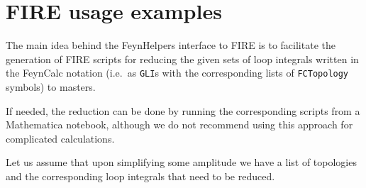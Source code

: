 \documentclass[../FeynHelpersManual.tex]{subfiles}
\begin{document}
\hypertarget{fire usage examples}{
\section{FIRE usage examples}\label{fire usage examples}}

The main idea behind the FeynHelpers interface to FIRE is to facilitate
the generation of FIRE scripts for reducing the given sets of loop
integrals written in the FeynCalc notation (i.e.~as \texttt{GLI}s with
the corresponding lists of \texttt{FCTopology} symbols) to masters.

If needed, the reduction can be done by running the corresponding
scripts from a Mathematica notebook, although we do not recommend using
this approach for complicated calculations.

Let us assume that upon simplifying some amplitude we have a list of
topologies and the corresponding loop integrals that need to be reduced.

\begin{Shaded}
\begin{Highlighting}[]
\ExtensionTok{=} \OperatorTok{\{}\OperatorTok{[}\OperatorTok{,} \OperatorTok{\{}\OperatorTok{[\{\{}\OperatorTok{,} \OperatorTok{\},} \OperatorTok{\{}\OperatorTok{,} \OperatorTok{\},} \OperatorTok{\}],}\OperatorTok{[\{\{}\OperatorTok{,} \OperatorTok{\},} \OperatorTok{\{}\OperatorTok{,} \OperatorTok{\},} \OperatorTok{\}],}\OperatorTok{[\{\{}\SpecialCharTok{+}\OperatorTok{,} \OperatorTok{\},} \OperatorTok{\{}\OperatorTok{,} \OperatorTok{\},} \OperatorTok{\}],}\OperatorTok{[\{\{} \SpecialCharTok{+}\OperatorTok{,} \OperatorTok{\},} \OperatorTok{\{}\OperatorTok{,} \OperatorTok{\},} \OperatorTok{\}],}\OperatorTok{[\{\{} \SpecialCharTok{{-}}\OperatorTok{,} \OperatorTok{\},} \OperatorTok{\{}\OperatorTok{,} \OperatorTok{\},} \OperatorTok{\}]\},} \OperatorTok{\{}\OperatorTok{,}\OperatorTok{\},} \OperatorTok{\{}\OperatorTok{\},} \OperatorTok{\{}\OperatorTok{[}\OperatorTok{][}\OperatorTok{[}\OperatorTok{,} \OperatorTok{],}\OperatorTok{[}\OperatorTok{,} \OperatorTok{]]} \OtherTok{{-}\textgreater{}}\OperatorTok{\},} \OperatorTok{\{\}]\}}\NormalTok{;}
\end{Highlighting}
\end{Shaded}
\end{document}
